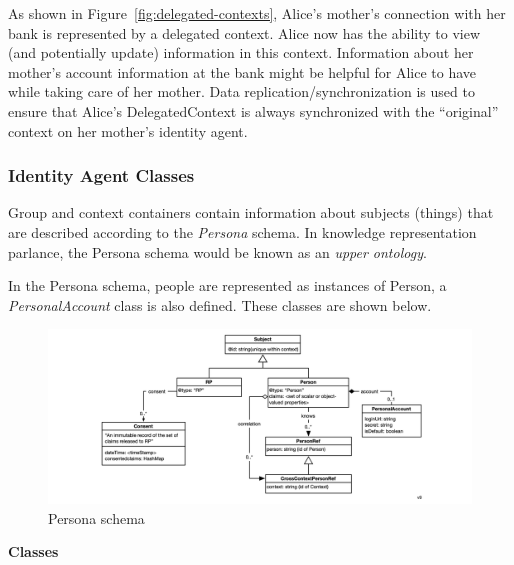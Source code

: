 \documentclass[11pt, oneside]{article}   	%
\begin{document}
As shown in Figure~\ref{fig:delegated-contexts}, Alice's mother's connection with her bank is represented by a delegated context. Alice now has the ability to view (and potentially update) information in this context. Information about her mother's account information at the bank might be helpful for Alice to have while taking care of her mother. Data replication/synchronization is used to ensure that Alice's DelegatedContext is always synchronized with the ``original'' context on her mother's identity agent.

\subsubsection{Identity Agent Classes}

Group and context containers contain information about subjects (things) that are described according to the \emph{Persona} schema. In knowledge representation parlance, the Persona schema would be known as an \emph{upper ontology}.

In the Persona schema, people are represented as instances of Person, a \emph{PersonalAccount} class is also defined. These classes are shown below. 

\begin{figure}[htbp]
\includegraphics[width=\textwidth]{./images/persona-classes.png}
\caption{Persona schema}
\end{figure}

\textbf{Classes}
\end{document}

